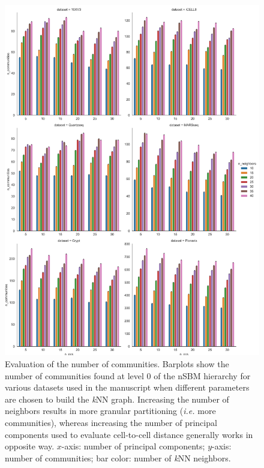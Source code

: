 \documentclass[11pt, titlepage, twoside]{article}
\begin{document}
\clearpage
\begin{figure}[H]
\centering
\includegraphics[keepaspectratio,width=.95\textwidth,height=\textheight]{Community_Count_L0.pdf}
\caption[]{Evaluation of the number of communities. Barplots show the number of communities found at level 0 of the nSBM hierarchy for various datasets used in the manuscript when different parameters are chosen to build the \emph{k}NN graph. Increasing the number of neighbors results in more granular partitioning (\emph{i.e.} more communities), whereas increasing the number of principal components used to evaluate cell-to-cell distance generally works in opposite way. $x$-axis: number of principal components; $y$-axis: number of communities; bar color: number of \emph{k}NN neighbors.} \label{Figure_Comm_Count}
\end{figure}
\end{document}

